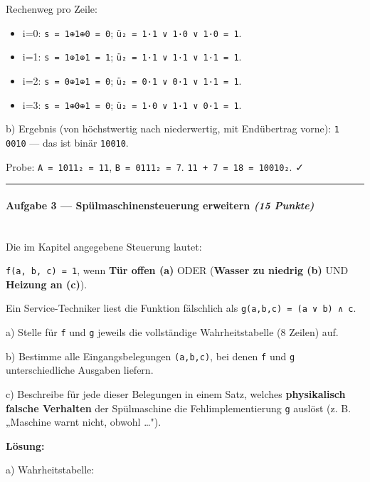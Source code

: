 \documentclass[11pt, a4paper]{article}
\begin{document}
Rechenweg pro Zeile:

\begin{itemize}
  \item i=0: \texttt{s = 1⊕1⊕0 = 0}; \texttt{ü₂ = 1·1 ∨ 1·0 ∨ 1·0 = 1}.
  \item i=1: \texttt{s = 1⊕1⊕1 = 1}; \texttt{ü₂ = 1·1 ∨ 1·1 ∨ 1·1 = 1}.
  \item i=2: \texttt{s = 0⊕1⊕1 = 0}; \texttt{ü₂ = 0·1 ∨ 0·1 ∨ 1·1 = 1}.
  \item i=3: \texttt{s = 1⊕0⊕1 = 0}; \texttt{ü₂ = 1·0 ∨ 1·1 ∨ 0·1 = 1}.
\end{itemize}

b) Ergebnis (von höchstwertig nach niederwertig, mit Endübertrag vorne): \texttt{1 0010} — das ist binär \texttt{10010}.


Probe: \texttt{A = 1011₂ = 11}, \texttt{B = 0111₂ = 7}. \texttt{11 + 7 = 18 = 10010₂}. ✓



\noindent\textcolor{rulegray}{\rule{\linewidth}{0.4pt}}


\paragraph{Aufgabe 3 — Spülmaschinensteuerung erweitern \textit{(15 Punkte)}}\mbox{}\\[2pt]

Die im Kapitel angegebene Steuerung lautet:


\texttt{f(a, b, c) = 1}, wenn \textbf{Tür offen (a)} ODER (\textbf{Wasser zu niedrig (b)} UND \textbf{Heizung an (c)}).


Ein Service-Techniker liest die Funktion fälschlich als \texttt{g(a,b,c) = (a ∨ b) ∧ c}.


a) Stelle für \texttt{f} und \texttt{g} jeweils die vollständige Wahrheitstabelle (8 Zeilen) auf.


b) Bestimme alle Eingangsbelegungen \texttt{(a,b,c)}, bei denen \texttt{f} und \texttt{g} unterschiedliche Ausgaben liefern.


c) Beschreibe für jede dieser Belegungen in einem Satz, welches \textbf{physikalisch falsche Verhalten} der Spülmaschine die Fehlimplementierung \texttt{g} auslöst (z. B. „Maschine warnt nicht, obwohl …").


\textbf{Lösung:}


a) Wahrheitstabelle:
\end{document}
